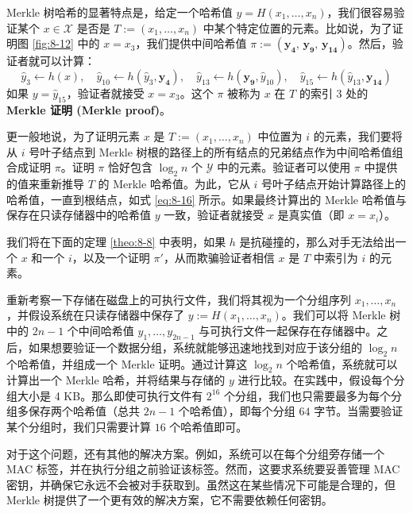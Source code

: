 \begin{snote}[成员证明。]
Merkle 树哈希的显著特点是，给定一个哈希值 $y=H(x_1,\dots,x_n)$，我们很容易验证某个 $x\in\mathcal{X}$ 是否是 $T:=(x_1,\dots,x_n)$ 中某个特定位置的元素。比如说，为了证明图 \ref{fig:8-12} 中的 $x=x_3$，我们提供中间哈希值 $\pi:=(\boldsymbol{y_4},\,\boldsymbol{y_9},\,\boldsymbol{y_{14}})$。然后，验证者就可以计算：
\begin{equation}\label{eq:8-16}
\hat{y}_3\leftarrow h(x),
\quad
\hat{y}_{10}\leftarrow h(\hat{y}_3,\boldsymbol{y_4}),
\quad
\hat{y}_{13}\leftarrow h(\boldsymbol{y_9},\hat{y}_{10}),
\quad
\hat{y}_{15}\leftarrow h(\hat{y}_{13},\boldsymbol{y_{14}})
\end{equation}
如果 $y=\hat{y}_{15}$，验证者就接受 $x=x_3$。这个 $\pi$ 被称为 $x$ 在 $T$ 的索引 $3$ 处的 \textbf{Merkle 证明 (Merkle proof)}。

更一般地说，为了证明元素 $x$ 是 $T:=(x_1,\dots,x_n)$ 中位置为 $i$ 的元素，我们要将从 $i$ 号叶子结点到 Merkle 树根的路径上的所有结点的兄弟结点作为中间哈希值组合成证明 $\pi$。证明 $\pi$ 恰好包含 $\log_2n$ 个 $\mathcal{Y}$ 中的元素。验证者可以使用 $\pi$ 中提供的值来重新推导 $T$ 的 Merkle 哈希值。为此，它从 $i$ 号叶子结点开始计算路径上的哈希值，一直到根结点，如式 \ref{eq:8-16} 所示。如果最终计算出的 Merkle 哈希值与保存在只读存储器中的哈希值 $y$ 一致，验证者就接受 $x$ 是真实值（即 $x=x_i$）。

我们将在下面的定理 \ref{theo:8-8} 中表明，如果 $h$ 是抗碰撞的，那么对手无法给出一个 $x$ 和一个 $i$，以及一个证明 $\pi'$，从而欺骗验证者相信 $x$ 是 $T$ 中索引为 $i$ 的元素。

重新考察一下存储在磁盘上的可执行文件，我们将其视为一个分组序列 $x_1,\dots,x_n$，并假设系统在只读存储器中保存了 $y:=H(x_1,\dots,x_n)$。我们可以将 Merkle 树中的 $2n-1$ 个中间哈希值 $y_1,\dots,y_{2n-1}$ 与可执行文件一起保存在存储器中。之后，如果想要验证一个数据分组，系统就能够迅速地找到对应于该分组的 $\log_2n$ 个哈希值，并组成一个 Merkle 证明。通过计算这 $\log_2n$ 个哈希值，系统就可以计算出一个 Merkle 哈希，并将结果与存储的 $y$ 进行比较。在实践中，假设每个分组大小是 4 KB。那么即使可执行文件有 $2^{16}$ 个分组，我们也只需要最多为每个分组多保存两个哈希值（总共 $2n-1$ 个哈希值），即每个分组 $64$ 字节。当需要验证某个分组时，我们只需要计算 $16$ 个哈希值即可。

对于这个问题，还有其他的解决方案。例如，系统可以在每个分组旁存储一个 MAC 标签，并在执行分组之前验证该标签。然而，这要求系统要妥善管理 MAC 密钥，并确保它永远不会被对手获取到。虽然这在某些情况下可能是合理的，但 Merkle 树提供了一个更有效的解决方案，它不需要依赖任何密钥。
\end{snote}

